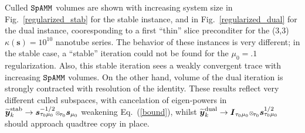 \documentclass[letterpaper,twocolumn,amsmath,amsfont,amssymb,english,aps,jcp,preprintnumbers,groupaddress,nofootinbib,tightenlines,floatfix]{revtex4}
\newcommand{\mat}[1]{\boldsymbol{#1}}
\newcommand{\oto}{ {\scriptstyle \otimes}_{ \! \tau_0 } }
\theoremstyle{plain}
\theoremstyle{remark}
\theoremstyle{plain}
\begin{document}
Culled $\tt SpAMM$ volumes are shown with increasing system size in Fig.~\ref{regularized_stab} for the stable instance, 
and  in Fig.~\ref{regularized_dual} for the dual instance, cooresponding to a first ``thin''  slice preconditer for the 
(3,3) $\kappa(\mat{s})=10^{10}$ nanotube series.  The behavior of these instances is very different; in the stable 
case, a ``stable'' iteration could not be found for the $\mu_0=.1$ regularization.  Also, this stable iteration
sees a weakly convergent trace with increasing $\tt SpAMM$ volumes.   On the other hand, volume of the dual iteration 
is strongly contracted with resolution of the identity.   
These results reflect very different culled subspaces, with 
cancelation of eigen-powers in 
$\widetilde{\mat{y}}^{\rm stab}_k \rightarrow  \mat{s}^{-1/2}_{\tau_0 \mu_0} \oto \mat{s}_{\mu_0}$ weakening Eq.~(\ref{bound}), whilst 
$\widetilde{\mat{y}}^{\rm dual}_k \rightarrow  \mat{I}_{\tau_0 \mu_0} \oto \mat{s}^{1/2}_{\tau_0 \mu_0}$ should approach  quadtree copy in place.   
\end{document}
